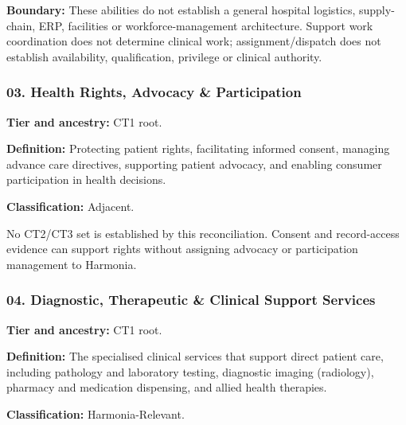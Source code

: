 \textbf{Boundary:} These abilities do not establish a general hospital logistics, supply-chain, ERP, facilities or workforce-management architecture. Support work coordination does not determine clinical work; assignment/\allowbreak{}dispatch does not establish availability, qualification, privilege or clinical authority.

\label{rad:business:437}
\subsubsection*{03. Health Rights, Advocacy \& Participation}
\label{rad:business:439}

\textbf{Tier and ancestry:} CT1 root.

\label{rad:business:441}

\textbf{Definition:} Protecting patient rights, facilitating informed consent, managing advance care directives, supporting patient advocacy, and enabling consumer participation in health decisions.

\label{rad:business:443}

\textbf{Classification:} Adjacent.

\label{rad:business:445}

No CT2/\allowbreak{}CT3 set is established by this reconciliation. Consent and record-access evidence can support rights without assigning advocacy or participation management to Harmonia.

\label{rad:business:447}
\subsubsection*{04. Diagnostic, Therapeutic \& Clinical Support Services}
\label{rad:business:449}

\textbf{Tier and ancestry:} CT1 root.

\label{rad:business:451}

\textbf{Definition:} The specialised clinical services that support direct patient care, including pathology and laboratory testing, diagnostic imaging (radiology), pharmacy and medication dispensing, and allied health therapies.

\label{rad:business:453}

\textbf{Classification:} Harmonia-Relevant.

\label{rad:business:455}


